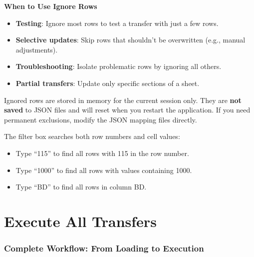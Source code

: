 \documentclass[11pt,a4paper]{article}
\begin{document}
\begin{stepbox}
\textbf{When to Use Ignore Rows}
\begin{itemize}[leftmargin=*, itemsep=2pt]
\item \textbf{Testing}: Ignore most rows to test a transfer with just a few rows.
\item \textbf{Selective updates}: Skip rows that shouldn't be overwritten (e.g., manual adjustments).
\item \textbf{Troubleshooting}: Isolate problematic rows by ignoring all others.
\item \textbf{Partial transfers}: Update only specific sections of a sheet.
\end{itemize}
\end{stepbox}

\begin{warningbox}
Ignored rows are stored in memory for the current session only. They are \textbf{not saved} to JSON files and will reset when you restart the application. If you need permanent exclusions, modify the JSON mapping files directly.
\end{warningbox}

\begin{infobox}
The filter box searches both row numbers and cell values:
\begin{itemize}[leftmargin=*, itemsep=2pt]
\item Type ``115'' to find all rows with 115 in the row number.
\item Type ``1000'' to find all rows with values containing 1000.
\item Type ``BD'' to find all rows in column BD.
\end{itemize}
\end{infobox}

\section{Execute All Transfers}

\subsubsection{Complete Workflow: From Loading to Execution}
\end{document}
